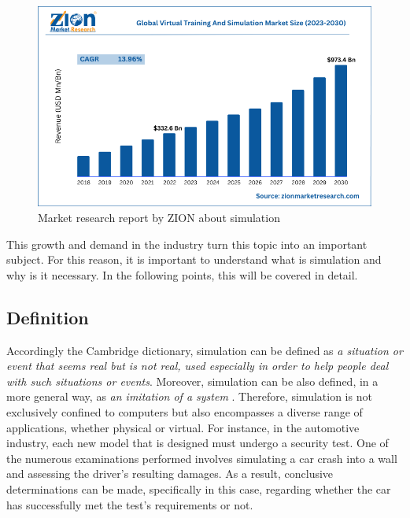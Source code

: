 \begin{figure}[H]
	\centering
 	\includegraphics[width=0.7\linewidth]{Images/ZION_MarketResearch.png}
 	\caption{Market research report by ZION about simulation \cite{zionMarketResearch}}
	 \label{fig_ZION_MarketResearch}
\end{figure}

This growth and demand in the industry turn this topic into an important subject. For this reason, it is important to understand what is 
simulation and why is it necessary. In the following points, this will be covered in detail.

\subsection{Definition}
\label{subsec:WhatIsSimulation}

Accordingly the Cambridge dictionary, simulation can be defined as \emph{a situation or event that seems real but is not real, used especially 
in order to help people deal with such situations or events}. Moreover, simulation can be also defined, in a more general way, as 
\emph{an imitation of a system} \cite{SimulationBook}. Therefore, simulation is not exclusively confined to computers but also encompasses a 
diverse range of applications, whether physical or virtual. For instance, in the automotive industry, each new model that is designed must 
undergo a security test. One of the numerous examinations performed involves simulating a car crash into a wall and assessing the driver's 
resulting damages. As a result, conclusive determinations can be made, specifically in this case, regarding whether the car has successfully 
met the test's requirements or not.

